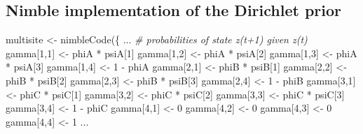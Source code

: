 \documentclass[
  12pt,
]{krantz}
\newenvironment{Shaded}{\begin{snugshade}}{\end{snugshade}}
\newcommand{\CommentTok}[1]{\textcolor[rgb]{0.56,0.35,0.01}{\textit{#1}}}
\newcommand{\DecValTok}[1]{\textcolor[rgb]{0.00,0.00,0.81}{#1}}
\newcommand{\FunctionTok}[1]{\textcolor[rgb]{0.00,0.00,0.00}{#1}}
\newcommand{\NormalTok}[1]{#1}
\newcommand{\OtherTok}[1]{\textcolor[rgb]{0.56,0.35,0.01}{#1}}
\newcommand{\SpecialCharTok}[1]{\textcolor[rgb]{0.00,0.00,0.00}{#1}}
\begin{document}
\hypertarget{nimble-implementation-of-the-dirichlet-prior-3}{%
\subsection{Nimble implementation of the Dirichlet prior}\label{nimble-implementation-of-the-dirichlet-prior-3}}

\begin{Shaded}
\begin{Highlighting}[]
\NormalTok{multisite }\OtherTok{\textless{}{-}} \FunctionTok{nimbleCode}\NormalTok{(\{}
\NormalTok{...}
  \CommentTok{\# probabilities of state z(t+1) given z(t)}
\NormalTok{  gamma[}\DecValTok{1}\NormalTok{,}\DecValTok{1}\NormalTok{] }\OtherTok{\textless{}{-}}\NormalTok{ phiA }\SpecialCharTok{*}\NormalTok{ psiA[}\DecValTok{1}\NormalTok{]}
\NormalTok{  gamma[}\DecValTok{1}\NormalTok{,}\DecValTok{2}\NormalTok{] }\OtherTok{\textless{}{-}}\NormalTok{ phiA }\SpecialCharTok{*}\NormalTok{ psiA[}\DecValTok{2}\NormalTok{]}
\NormalTok{  gamma[}\DecValTok{1}\NormalTok{,}\DecValTok{3}\NormalTok{] }\OtherTok{\textless{}{-}}\NormalTok{ phiA }\SpecialCharTok{*}\NormalTok{ psiA[}\DecValTok{3}\NormalTok{]}
\NormalTok{  gamma[}\DecValTok{1}\NormalTok{,}\DecValTok{4}\NormalTok{] }\OtherTok{\textless{}{-}} \DecValTok{1} \SpecialCharTok{{-}}\NormalTok{ phiA}
\NormalTok{  gamma[}\DecValTok{2}\NormalTok{,}\DecValTok{1}\NormalTok{] }\OtherTok{\textless{}{-}}\NormalTok{ phiB }\SpecialCharTok{*}\NormalTok{ psiB[}\DecValTok{1}\NormalTok{]}
\NormalTok{  gamma[}\DecValTok{2}\NormalTok{,}\DecValTok{2}\NormalTok{] }\OtherTok{\textless{}{-}}\NormalTok{ phiB }\SpecialCharTok{*}\NormalTok{ psiB[}\DecValTok{2}\NormalTok{]}
\NormalTok{  gamma[}\DecValTok{2}\NormalTok{,}\DecValTok{3}\NormalTok{] }\OtherTok{\textless{}{-}}\NormalTok{ phiB }\SpecialCharTok{*}\NormalTok{ psiB[}\DecValTok{3}\NormalTok{]}
\NormalTok{  gamma[}\DecValTok{2}\NormalTok{,}\DecValTok{4}\NormalTok{] }\OtherTok{\textless{}{-}} \DecValTok{1} \SpecialCharTok{{-}}\NormalTok{ phiB}
\NormalTok{  gamma[}\DecValTok{3}\NormalTok{,}\DecValTok{1}\NormalTok{] }\OtherTok{\textless{}{-}}\NormalTok{ phiC }\SpecialCharTok{*}\NormalTok{ psiC[}\DecValTok{1}\NormalTok{]}
\NormalTok{  gamma[}\DecValTok{3}\NormalTok{,}\DecValTok{2}\NormalTok{] }\OtherTok{\textless{}{-}}\NormalTok{ phiC }\SpecialCharTok{*}\NormalTok{ psiC[}\DecValTok{2}\NormalTok{]}
\NormalTok{  gamma[}\DecValTok{3}\NormalTok{,}\DecValTok{3}\NormalTok{] }\OtherTok{\textless{}{-}}\NormalTok{ phiC }\SpecialCharTok{*}\NormalTok{ psiC[}\DecValTok{3}\NormalTok{]}
\NormalTok{  gamma[}\DecValTok{3}\NormalTok{,}\DecValTok{4}\NormalTok{] }\OtherTok{\textless{}{-}} \DecValTok{1} \SpecialCharTok{{-}}\NormalTok{ phiC}
\NormalTok{  gamma[}\DecValTok{4}\NormalTok{,}\DecValTok{1}\NormalTok{] }\OtherTok{\textless{}{-}} \DecValTok{0}
\NormalTok{  gamma[}\DecValTok{4}\NormalTok{,}\DecValTok{2}\NormalTok{] }\OtherTok{\textless{}{-}} \DecValTok{0}
\NormalTok{  gamma[}\DecValTok{4}\NormalTok{,}\DecValTok{3}\NormalTok{] }\OtherTok{\textless{}{-}} \DecValTok{0}
\NormalTok{  gamma[}\DecValTok{4}\NormalTok{,}\DecValTok{4}\NormalTok{] }\OtherTok{\textless{}{-}} \DecValTok{1}
\NormalTok{...}
\end{Highlighting}
\end{Shaded}
\end{document}
